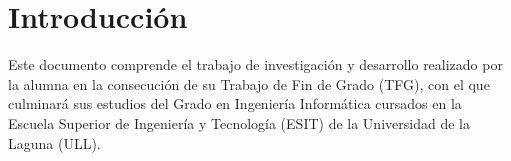 %
%

\chapter*{Introducción}

Este documento comprende el trabajo de investigación y desarrollo realizado por la alumna en la consecución de su Trabajo de Fin de Grado (TFG), con el que culminará sus estudios del Grado en Ingeniería Informática cursados en la Escuela Superior de Ingeniería y Tecnología (ESIT) de la Universidad de la Laguna (ULL).
